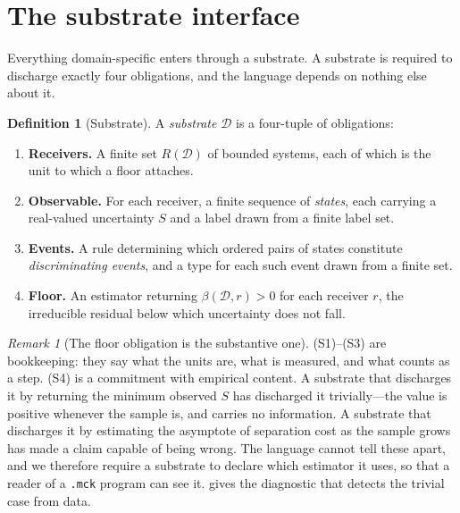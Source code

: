 \documentclass[11pt,a4paper]{article}
\theoremstyle{thmstyle}
\theoremstyle{definition}
\newtheorem{definition}[theorem]{Definition}
\theoremstyle{remark}
\newtheorem{remark}[theorem]{Remark}
\newcommand{\flo}{\beta}
\begin{document}
\section{The substrate interface}
\label{sec:substrate}

Everything domain-specific enters through a substrate. A substrate is
required to discharge exactly four obligations, and the language depends on
nothing else about it.

\begin{definition}[Substrate]
\label{def:substrate}
A \emph{substrate} $\mathcal{D}$ is a four-tuple of obligations:
\begin{enumerate}[label=\textup{(S\arabic*)},leftmargin=3.2em,nosep]
\item \textbf{Receivers.} A finite set $R(\mathcal{D})$ of bounded systems,
each of which is the unit to which a floor attaches.
\item \textbf{Observable.} For each receiver, a finite sequence of
\emph{states}, each carrying a real-valued uncertainty $S$ and a label drawn
from a finite label set.
\item \textbf{Events.} A rule determining which ordered pairs of states
constitute \emph{discriminating events}, and a type for each such event
drawn from a finite set.
\item \textbf{Floor.} An estimator returning $\flo(\mathcal{D},r)>0$ for
each receiver $r$, the irreducible residual below which uncertainty does not
fall.
\end{enumerate}
\end{definition}

\begin{remark}[The floor obligation is the substantive one]
\label{rem:floor-obligation}
(S1)--(S3) are bookkeeping: they say what the units are, what is measured,
and what counts as a step. (S4) is a commitment with empirical content. A
substrate that discharges it by returning the minimum observed $S$ has
discharged it trivially---the value is positive whenever the sample is, and
carries no information. A substrate that discharges it by estimating the
asymptote of separation cost as the sample grows has made a claim capable of
being wrong. The language cannot tell these apart, and we therefore require
a substrate to declare which estimator it uses, so that a reader of a
\texttt{.mck} program can see it.  gives the
diagnostic that detects the trivial case from data.
\end{remark}
\end{document}
